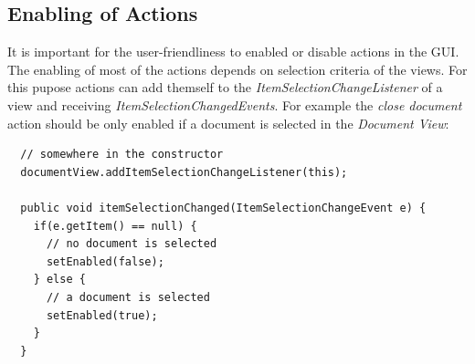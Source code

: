 \subsection{Enabling of Actions}
It is important for the user-friendliness to enabled or disable actions in the GUI. The enabling of most of the actions depends on selection criteria of the views. For this pupose actions can add themself to the \textit{ItemSelectionChangeListener} of a view and receiving \textit{ItemSelectionChangedEvents}.  For example the \textit{close document} action should be only enabled if a document is selected in the \textit{Document View}:
\begin{verbatim}
  // somewhere in the constructor
  documentView.addItemSelectionChangeListener(this);

  public void itemSelectionChanged(ItemSelectionChangeEvent e) {
    if(e.getItem() == null) {
      // no document is selected
      setEnabled(false);
    } else {
      // a document is selected
      setEnabled(true);
    }
  }
\end{verbatim}

